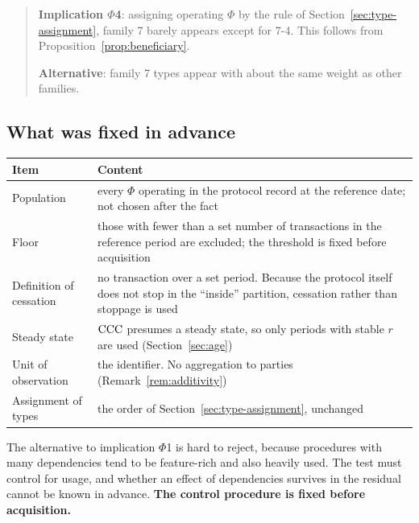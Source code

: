 \begin{quote}
\textbf{Implication $\Phi$4}: assigning operating $\Phi$ by the rule of
Section~\ref{sec:type-assignment}, family 7 barely appears except for 7-4. This follows from
Proposition~\ref{prop:beneficiary}.

\textbf{Alternative}: family 7 types appear with about the same weight as other families.
\end{quote}

\subsection{What was fixed in advance}

\begin{center}
\begin{tabularx}{\textwidth}{@{}lX@{}}
\toprule
Item & Content \\
\midrule
Population & every $\Phi$ operating in the protocol record at the reference date; not chosen after the fact \\
Floor & those with fewer than a set number of transactions in the reference period are excluded; the threshold is fixed before acquisition \\
Definition of cessation & no transaction over a set period. Because the protocol itself does not stop in the ``inside'' partition, cessation rather than stoppage is used \\
Steady state & $\mathrm{CCC}$ presumes a steady state, so only periods with stable $r$ are used (Section~\ref{sec:age}) \\
Unit of observation & the identifier. No aggregation to parties (Remark~\ref{rem:additivity}) \\
Assignment of types & the order of Section~\ref{sec:type-assignment}, unchanged \\
\bottomrule
\end{tabularx}
\label{tab:protocol-registration}
\end{center}

\begin{remark}
\label{rem:dep-usage-confound}
The alternative to implication $\Phi$1 is hard to reject, because procedures with many
dependencies tend to be feature-rich and also heavily used. The test must control for usage,
and whether an effect of dependencies survives in the residual cannot be known in advance.
\textbf{The control procedure is fixed before acquisition.}
\end{remark}

